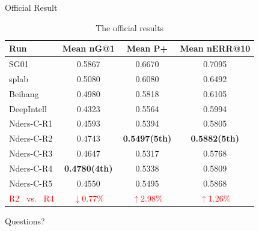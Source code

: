 \documentclass[aspectratio=169]{beamer} %
\begin{document}
  \begin{frame}{Official Result}
        \begin{table}
    \centering
    \caption{The official results}
    \label{tab:commands}
    \begin{minipage}{\columnwidth}
    \begin{center}
    \begin{tabular}{|l|c|c|c|}
    \hline
     Run        &  Mean nG@1  &  Mean P+  &  Mean nERR@10  \\ \hline
     SG01 & 0.5867 & 0.6670 & 0.7095 \\ \hline
     splab & 0.5080 & 0.6080 & 0.6492 \\ \hline
     Beihang & 0.4980 & 0.5818 & 0.6105 \\ \hline
     DeepIntell & 0.4323 & 0.5564 & 0.5994 \\ \hline
     Nders-C-R1 & 0.4593 & 0.5394 & 0.5805 \\ \hline
     Nders-C-R2 & 0.4743 & \textbf{0.5497(5th)} & \textbf{0.5882(5th)} \\ \hline
     Nders-C-R3 & 0.4647 & 0.5317 & 0.5768 \\ \hline
     Nders-C-R4 & \textbf{0.4780(4th)} & 0.5338 & 0.5809 \\ \hline
     Nders-C-R5 & 0.4550 & 0.5495 & 0.5868 \\ \hline
     \textcolor{red}{R2 \ vs. \  R4}  & \textcolor{red}{$\downarrow$0.77\%} & \textcolor{red}{$\uparrow$2.98\%} & \textcolor{red}{$\uparrow$1.26\%} \\ \hline

    \end{tabular}
    \end{center}
    \end{minipage}
    \end{table}
  \end{frame}

  \begin{frame}[standout]
    Questions?
  \end{frame}
\end{document}
